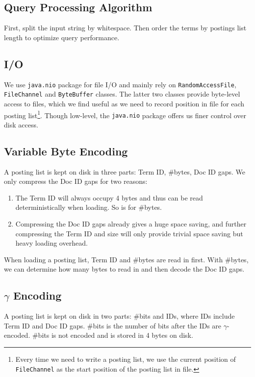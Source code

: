 \documentclass{article}
\newcommand{\tmtt}[1]{\texttt{#1}}
\newenvironment{enumeratenumeric}{\begin{enumerate}[1.] }{\end{enumerate}}
\begin{document}
\subsection{Query Processing Algorithm}

First, split the input string by whitespace. Then order the terms by postings
list length to optimize query performance.

\subsection{I/O}

We use {\tmtt{java.nio}} package for file I/O and mainly rely on
{\tmtt{RandomAccessFile}}, {\tmtt{FileChannel}} and {\tmtt{ByteBuffer}}
classes. The latter two classes provide byte-level access to files, which we
find useful as we need to record position in file for each posting
list{\footnote{Every time we need to write a posting list, we use the current
position of {\tmtt{FileChannel}} as the start position of the posting list in
file.}}. Though low-level, the {\tmtt{java.nio}} package offers us finer
control over disk access.

\subsection{Variable Byte Encoding}

A posting list is kept on disk in three parts: Term ID, \#bytes, Doc ID gaps.
We only compress the Doc ID gaps for two reasons:
\begin{enumeratenumeric}
  \item The Term ID will always occupy 4 bytes and thus can be read
  deterministically when loading. So is for \#bytes.
  
  \item Compressing the Doc ID gaps already gives a huge space saving, and
  further compressing the Term ID and size will only provide trivial space
  saving but heavy loading overhead.
\end{enumeratenumeric}
When loading a posting list, Term ID and \#bytes are read in first. With
\#bytes, we can determine how many bytes to read in and then decode the Doc ID
gaps.

\subsection{$\gamma$ Encoding}

A posting list is kept on disk in two parts: \#bits and IDs, where IDs include
Term ID and Doc ID gaps. \#bits is the number of bits after the IDs are
$\gamma$-encoded. \#bits is not encoded and is stored in 4 bytes on disk.
\end{document}
